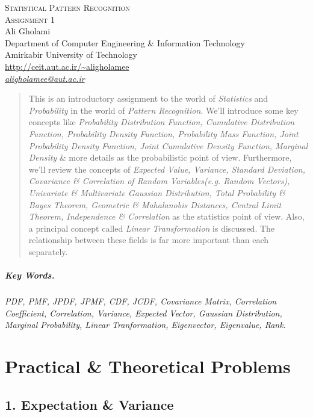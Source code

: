 \documentclass[12pt]{article}
\numberwithin{equation}{section}
\numberwithin{table}{section}
\numberwithin{figure}{section}
\begin{document}

\begin{center}
\textsc{\Large Statistical Pattern Recognition} \\[2pt]
	\textsc{\large Assignment 1}\\
	\vspace{0.5cm}
  Ali Gholami \\[6pt]
  Department of Computer Engineering \& Information Technology\\
  Amirkabir University of Technology  \\[6pt]
  \def\UrlFont{\em}
  \url{http://ceit.aut.ac.ir/~aligholamee}\\
    \href{mailto:aligholamee@aut.ac.ir}{\textit{aligholamee@aut.ac.ir}}
\end{center}

\begin{abstract}
This is an introductory assignment to the world of \textit{Statistics} and \textit{Probability} in the world of \textit{Pattern Recognition}. We'll introduce some key concepts like \textit{Probability Distribution Function, Cumulative Distribution Function, Probability Density Function, Probability Mass Function, Joint Probability Density Function, Joint Cumulative Density Function, Marginal Density} \& more details as the probabilistic point of view. Furthermore, we'll review the concepts of \textit{Expected Value, Variance, Standard Deviation, Covariance \& Correlation of Random Variables(e.g. Random Vectors), Univariate \& Multivariate Gaussian Distribution, Total Probability \& Bayes Theorem, Geometric \& Mahalanobis Distances, Central Limit Theorem, Independence \& Correlation} as the statistics point of view. Also, a principal concept called \textit{Linear Transformation} is discussed. The relationship between these fields is far more important than each separately.
\end{abstract}

\subparagraph{Key Words.} \textit{PDF, PMF, JPDF, JPMF, CDF, JCDF, Covariance Matrix, Correlation Coefficient, Correlation, Variance, Expected Vector, Gaussian Distribution, Marginal Probability, Linear Tranformation, Eigenvector, Eigenvalue, Rank.}

\section{Practical \& Theoretical Problems}
\subsection{1. Expectation \& Variance}
\end{document}
